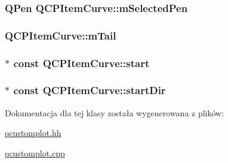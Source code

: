 \subsubsection[{\texorpdfstring{m\+Selected\+Pen}{mSelectedPen}}]{\setlength{\rightskip}{0pt plus 5cm}Q\+Pen Q\+C\+P\+Item\+Curve\+::m\+Selected\+Pen\hspace{0.3cm}{\ttfamily [protected]}}\hypertarget{class_q_c_p_item_curve_ab22cbab261b20be5aa8e4ca252149246}{}\label{class_q_c_p_item_curve_ab22cbab261b20be5aa8e4ca252149246}
\subsubsection[{\texorpdfstring{m\+Tail}{mTail}}]{ Q\+C\+P\+Item\+Curve\+::m\+Tail\hspace{0.3cm}{\ttfamily [protected]}}\hypertarget{class_q_c_p_item_curve_af1dca285b97e3f5b892dab827a79f327}{}\label{class_q_c_p_item_curve_af1dca285b97e3f5b892dab827a79f327}
\subsubsection[{\texorpdfstring{start}{start}}]{$\ast$ const Q\+C\+P\+Item\+Curve\+::start}\hypertarget{class_q_c_p_item_curve_a20c3b5ea31c33764f4f30c2ec7ae518b}{}\label{class_q_c_p_item_curve_a20c3b5ea31c33764f4f30c2ec7ae518b}
\subsubsection[{\texorpdfstring{start\+Dir}{startDir}}]{$\ast$ const Q\+C\+P\+Item\+Curve\+::start\+Dir}\hypertarget{class_q_c_p_item_curve_aa124bf66c09cc51c627fb49db8bf8a7b}{}\label{class_q_c_p_item_curve_aa124bf66c09cc51c627fb49db8bf8a7b}


Dokumentacja dla tej klasy została wygenerowana z plików\+:\begin{DoxyCompactItemize}
\item 
\hyperlink{qcustomplot_8hh}{qcustomplot.\+hh}\item 
\hyperlink{qcustomplot_8cpp}{qcustomplot.\+cpp}\end{DoxyCompactItemize}
